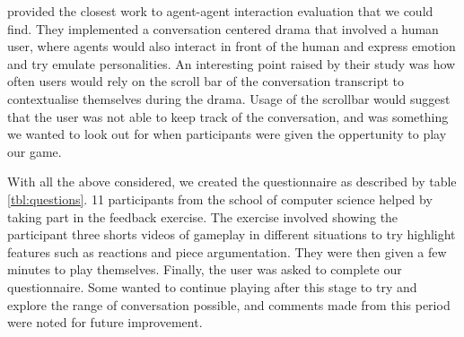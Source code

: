 \documentclass{article}
\begin{document}
\cite{convdrama} provided the closest work to agent-agent interaction evaluation that we could find. They implemented a conversation centered drama that involved a human user, where agents would also interact in front of the human and express emotion and try emulate personalities. An interesting point raised by their study was how often users would rely on the scroll bar of the conversation transcript to contextualise themselves during the drama. Usage of the scrollbar would suggest that the user was not able to keep track of the conversation, and was something we wanted to look out for when participants were given the oppertunity to play our game.

With all the above considered, we created the questionnaire as described by table \ref{tbl:questions}. 11 participants from the school of computer science helped by taking part in the feedback exercise. The exercise involved showing the participant three shorts videos of gameplay in different situations to try highlight features such as reactions and piece argumentation. They were then given a few minutes to play themselves. Finally, the user was asked to complete our questionnaire. Some wanted to continue playing after this stage to try and explore the range of conversation possible, and comments made from this period were noted for future improvement.
\end{document}
